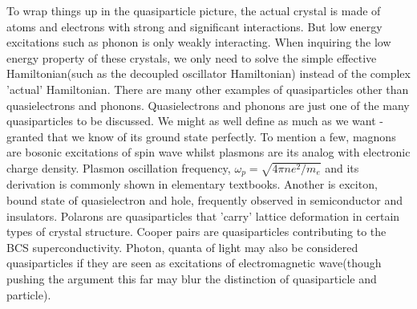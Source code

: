 \documentclass{article}
\begin{document}
To wrap things up in the quasiparticle picture, the actual crystal is made of atoms and electrons with strong and significant interactions. But low energy excitations such as phonon is only weakly interacting. When inquiring the low energy property of these crystals, we only need to solve the simple effective Hamiltonian(such as the decoupled oscillator Hamiltonian) instead of the complex 'actual' Hamiltonian. There are many other examples of quasiparticles other than quasielectrons and phonons. Quasielectrons and phonons are just one of the many quasiparticles to be discussed. We might as well define as much as we want - granted that we know of its ground state perfectly. To mention a few, magnons are bosonic excitations of spin wave whilst plasmons are its analog with electronic charge density. Plasmon oscillation frequency, $\omega_p=\sqrt{4\pi ne^2/m_e}$ and its derivation is commonly shown in elementary textbooks. Another is exciton, bound state of quasielectron and hole, frequently observed in semiconductor and insulators. Polarons are quasiparticles that 'carry' lattice deformation in certain types of crystal structure. Cooper pairs are quasiparticles contributing to the BCS superconductivity. Photon, quanta of light may also be considered quasiparticles if they are seen as excitations of electromagnetic wave(though pushing the argument this far may blur the distinction of quasiparticle and particle).
\end{document}
